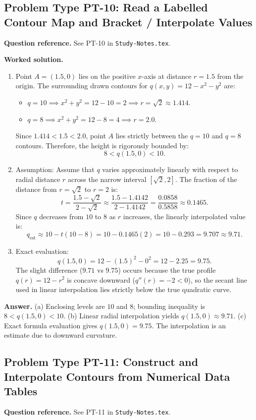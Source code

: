 \documentclass[11pt,letterpaper]{article}
\begin{document}
\subsection{Problem Type PT-10: Read a Labelled Contour Map and Bracket / Interpolate Values}
\textbf{Question reference.} See PT-10 in \texttt{Study-Notes.tex}.

\textbf{Worked solution.}
\begin{enumerate}[label=(\alph*),leftmargin=*]
    \item Point $A = (1.5, 0)$ lies on the positive $x$-axis at distance $r = 1.5$ from the origin.
    The surrounding drawn contours for $q(x,y) = 12 - x^2 - y^2$ are:
    \begin{itemize}[nosep]
        \item $q = 10 \implies x^2+y^2 = 12-10 = 2 \implies r = \sqrt{2} \approx 1.414$.
        \item $q = 8 \implies x^2+y^2 = 12-8 = 4 \implies r = 2.0$.
    \end{itemize}
    Since $1.414 < 1.5 < 2.0$, point $A$ lies strictly between the $q=10$ and $q=8$ contours.
    Therefore, the height is rigorously bounded by:
    \[ 8 < q(1.5,0) < 10. \]
    \item Assumption: Assume that $q$ varies approximately linearly with respect to radial distance $r$ across the narrow interval $[\sqrt{2}, 2]$.
    The fraction of the distance from $r = \sqrt{2}$ to $r = 2$ is:
    \[ t = \frac{1.5 - \sqrt{2}}{2 - \sqrt{2}} \approx \frac{1.5 - 1.4142}{2 - 1.4142} = \frac{0.0858}{0.5858} \approx 0.1465. \]
    Since $q$ decreases from $10$ to $8$ as $r$ increases, the linearly interpolated value is:
    \[ q_{\text{est}} \approx 10 - t(10 - 8) = 10 - 0.1465(2) = 10 - 0.293 = 9.707 \approx 9.71. \]
    \item Exact evaluation:
    \[ q(1.5, 0) = 12 - (1.5)^2 - 0^2 = 12 - 2.25 = 9.75. \]
    The slight difference ($9.71$ vs $9.75$) occurs because the true profile $q(r) = 12 - r^2$ is concave downward ($q''(r) = -2 < 0$), so the secant line used in linear interpolation lies strictly below the true quadratic curve.
\end{enumerate}

\textbf{Answer.}
(a) Enclosing levels are $10$ and $8$; bounding inequality is $8 < q(1.5,0) < 10$.
(b) Linear radial interpolation yields $q(1.5,0) \approx 9.71$.
(c) Exact formula evaluation gives $q(1.5,0) = 9.75$. The interpolation is an estimate due to downward curvature.

\subsection{Problem Type PT-11: Construct and Interpolate Contours from Numerical Data Tables}
\textbf{Question reference.} See PT-11 in \texttt{Study-Notes.tex}.
\end{document}
